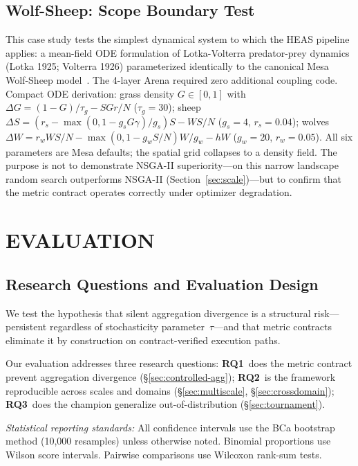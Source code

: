 \documentclass{wscpaperproc}
\begin{document}
\subsection{Wolf-Sheep: Scope Boundary Test}
\label{sec:wolfsheep}

This case study tests the simplest dynamical system to which the HEAS pipeline
applies: a mean-field ODE formulation of Lotka-Volterra predator-prey dynamics
(Lotka 1925; Volterra 1926) parameterized identically to the canonical Mesa
Wolf-Sheep model~\cite{wilensky1997wolfsheep,kazil2020mesa}. The 4-layer Arena
required zero additional coupling code. Compact ODE derivation: grass density
$G\!\in\![0,1]$ with $\Delta G\!=\!(1\!-\!G)/\tau_g - SGr/N$ ($\tau_g\!=\!30$);
sheep $\Delta S\!=\!(r_s - \max(0,1-g_s G\gamma)/g_s)S - WS/N$ ($g_s\!=\!4$,
$r_s\!=\!0.04$); wolves $\Delta W\!=\!r_w WS/N - \max(0,1-g_w S/N)W/g_w - hW$
($g_w\!=\!20$, $r_w\!=\!0.05$). All six parameters are Mesa defaults; the
spatial grid collapses to a density field. The purpose is not to demonstrate
NSGA-II superiority---on this narrow landscape random search outperforms NSGA-II
(Section~\ref{sec:scale})---but to confirm that the metric contract operates
correctly under optimizer degradation.

\section{EVALUATION}

\subsection{Research Questions and Evaluation Design}

We test the hypothesis that silent aggregation divergence is a structural
risk---persistent regardless of stochasticity parameter~$\tau$---and that metric
contracts eliminate it by construction on contract-verified execution paths.

Our evaluation addresses three research questions:
\textbf{RQ1}~does the metric contract prevent aggregation divergence
(\S\ref{sec:controlled-agg});
\textbf{RQ2}~is the framework reproducible across scales and domains
(\S\ref{sec:multiscale}, \S\ref{sec:crossdomain});
\textbf{RQ3}~does the champion generalize out-of-distribution
(\S\ref{sec:tournament}).

\emph{Statistical reporting standards:} All confidence intervals use the BCa
bootstrap method (10,000 resamples) unless otherwise noted. Binomial proportions
use Wilson score intervals. Pairwise comparisons use Wilcoxon rank-sum tests.
\end{document}
